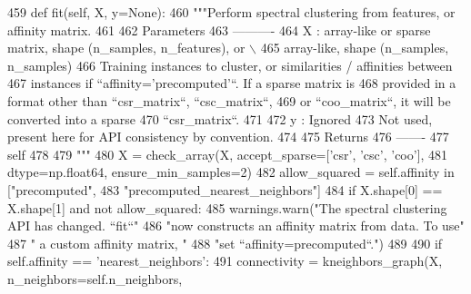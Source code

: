 \begin{DoxyCode}
459     \textcolor{keyword}{def }fit(self, X, y=None):
460         \textcolor{stringliteral}{"""Perform spectral clustering from features, or affinity matrix.}
461 \textcolor{stringliteral}{}
462 \textcolor{stringliteral}{        Parameters}
463 \textcolor{stringliteral}{        ----------}
464 \textcolor{stringliteral}{        X : array-like or sparse matrix, shape (n\_samples, n\_features), or \(\backslash\)}
465 \textcolor{stringliteral}{            array-like, shape (n\_samples, n\_samples)}
466 \textcolor{stringliteral}{            Training instances to cluster, or similarities / affinities between}
467 \textcolor{stringliteral}{            instances if ``affinity='precomputed'``. If a sparse matrix is}
468 \textcolor{stringliteral}{            provided in a format other than ``csr\_matrix``, ``csc\_matrix``,}
469 \textcolor{stringliteral}{            or ``coo\_matrix``, it will be converted into a sparse}
470 \textcolor{stringliteral}{            ``csr\_matrix``.}
471 \textcolor{stringliteral}{}
472 \textcolor{stringliteral}{        y : Ignored}
473 \textcolor{stringliteral}{            Not used, present here for API consistency by convention.}
474 \textcolor{stringliteral}{}
475 \textcolor{stringliteral}{        Returns}
476 \textcolor{stringliteral}{        -------}
477 \textcolor{stringliteral}{        self}
478 \textcolor{stringliteral}{}
479 \textcolor{stringliteral}{        """}
480         X = check\_array(X, accept\_sparse=[\textcolor{stringliteral}{'csr'}, \textcolor{stringliteral}{'csc'}, \textcolor{stringliteral}{'coo'}],
481                         dtype=np.float64, ensure\_min\_samples=2)
482         allow\_squared = self.affinity \textcolor{keywordflow}{in} [\textcolor{stringliteral}{"precomputed"},
483                                           \textcolor{stringliteral}{"precomputed\_nearest\_neighbors"}]
484         \textcolor{keywordflow}{if} X.shape[0] == X.shape[1] \textcolor{keywordflow}{and} \textcolor{keywordflow}{not} allow\_squared:
485             warnings.warn(\textcolor{stringliteral}{"The spectral clustering API has changed. ``fit``"}
486                           \textcolor{stringliteral}{"now constructs an affinity matrix from data. To use"}
487                           \textcolor{stringliteral}{" a custom affinity matrix, "}
488                           \textcolor{stringliteral}{"set ``affinity=precomputed``."})
489 
490         \textcolor{keywordflow}{if} self.affinity == \textcolor{stringliteral}{'nearest\_neighbors'}:
491             connectivity = kneighbors\_graph(X, n\_neighbors=self.n\_neighbors,

\end{DoxyCode}

